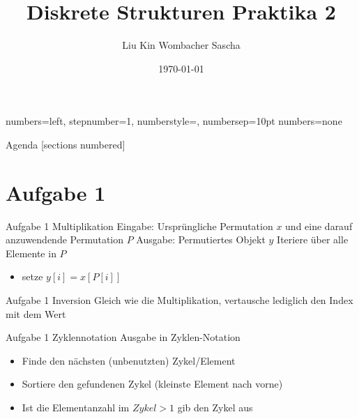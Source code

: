 \documentclass[aspectratio=169]{beamer}
\title{Diskrete Strukturen \newline Praktika 2}
\date{\today}
\author{Liu Kin \newline Wombacher Sascha \newline}
\begin{document}
  {numbers=left, stepnumber=1, numberstyle=\tiny, numbersep=10pt}
  {numbers=none}

  \maketitle
  \begin{frame}{Agenda}
    [sections numbered]
    \tableofcontents[hideallsubsections]
  \end{frame}
  
  
\section{Aufgabe 1}
    \begin{frame}{Aufgabe 1 \newline Multiplikation}
    	Eingabe: Ursprüngliche Permutation $x$ und eine darauf anzuwendende Permutation $P$ \newline
    	Ausgabe: Permutiertes Objekt $y$ \newline
    	\mbox{} \newline
    	Iteriere über alle Elemente in $P$
    	\begin{itemize}
    		\item setze $y[i] = x[P[i]]$
    	\end{itemize}
    \end{frame}
    
    \begin{frame}{Aufgabe 1 \newline Inversion}
    	Gleich wie die Multiplikation, \newline vertausche lediglich den Index mit dem Wert
    \end{frame}
    
    \begin{frame}{Aufgabe 1 \newline Zyklennotation}
    	Ausgabe in Zyklen-Notation
    	\begin{itemize}
    		\item Finde den nächsten (unbenutzten) Zykel/Element
    		\item Sortiere den gefundenen Zykel (kleinste Element nach vorne)
    		\item Ist die Elementanzahl im $Zykel > 1$ gib den Zykel aus
    	\end{itemize}
    \end{frame}
    
\end{document}
